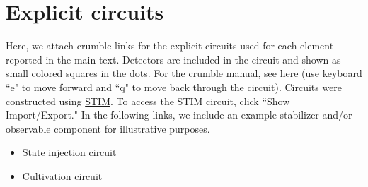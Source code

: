\section{\label{sec:explicit_circuits}Explicit circuits}
Here, we attach crumble links for the explicit circuits used for each element reported in the main text. Detectors are included in the circuit and shown as small colored squares in the dots. For the crumble manual, see \href{https://github.com/quantumlib/Stim/blob/main/glue/crumble/README.md}{here} (use keyboard ``e" to move forward and ``q" to move back through the circuit). Circuits were constructed using \hyperlink{https://github.com/quantumlib/Stim/tree/main}{STIM}. To access the STIM circuit, click ``Show Import/Export." In the following links, we include an example stabilizer and/or observable component for illustrative purposes. 
\begin{itemize}
\item \href{https://algassert.com/crumble#circuit=Q(2,2)0;Q(3,1)1;Q(3,2)2;Q(3,3)3;Q(4,1)4;Q(4,2)5;Q(4,3)6;Q(4,4)7;Q(5,1)8;Q(5,2)9;Q(5,3)10;R_1_2_3_6_7_8_5_4_9_10_0;MARKZ(0)5;MARKZ(1)9;POLYGON(0,0,1,0.25)1_8_10_5;POLYGON(0,1,0,0.25)1_5_3_0;POLYGON(1,0,0,0.25)5_10_7_3;TICK;H[injection]_5;TICK;I[injection]_5;TICK;H_0_1_2_4_8_9_10;TICK;CZ_1_4_2_5_8_9;TICK;H_2_3_8;TICK;CZ_2_3;TICK;H_3_5_6;TICK;CZ_1_2_3_6_4_5;TICK;H_2_6;TICK;CZ_2_3_5_6;TICK;H_6;TICK;CZ_0_2_6_10;TICK;H_2_3_4_6_7;TICK;CZ_1_2_3_6;TICK;CZ_2_5_4_8_6_7;TICK;H_4_7_10;TICK;CZ_1_4_2_3_5_6_9_10;TICK;H_1_2_3_6_9_10;TICK;CZ_0_2_4_5_6_7_8_9;TICK;H_2_4_5_6_9;TICK;M_2_4_9_6;MARKZ(1)4}{State injection circuit} 
\item \href{https://algassert.com/crumble#circuit=Q(2,2)0;Q(3,1)1;Q(3,2)2;Q(3,3)3;Q(4,1)4;Q(4,2)5;Q(4,3)6;Q(4,4)7;Q(5,1)8;Q(5,2)9;Q(5,3)10;Q(6,2)11;R_2_4_6_9;MARKX(0)7_3_0_1_5_10_8;MARKX(1)10_5_1_8;MARKZ(0)2_6_9;POLYGON(0,0,1,0.25)1_8_10_5;POLYGON(0,1,0,0.25)1_5_3_0;POLYGON(1,0,0,0.25)5_10_7_3;TICK;I[T_gate]_0_1_3_5_7_8_10;TICK;H_1_2_4_5_6_7_8_9;TICK;CZ_1_2_4_5_6_7_8_9;TICK;H_0_5_9_10;TICK;CZ_0_2_5_9_6_10;TICK;H_2_3_9_11;TICK;CZ_2_5_3_6_9_11;TICK;H_5_9_11;TICK;CZ_5_6_9_11;TICK;H_6_9;TICK;M[root_measurement]_6_9;MARKZ(0)6;TICK;R_6_9;TICK;H_6_9;TICK;CZ_5_6_9_11;TICK;H_5_9_11;TICK;CZ_2_5_3_6_9_11;TICK;H_2_3_9_11;TICK;CZ_0_2_5_9_6_10;TICK;H_0_5_9_10;TICK;CZ_1_2_4_5_6_7_8_9;TICK;H_1_2_4_5_6_7_8_9;TICK;I[negative_T_gate]_0_1_3_5_7_8_10;TICK;M_2_4_6_9}{Cultivation circuit}

\end{itemize}
